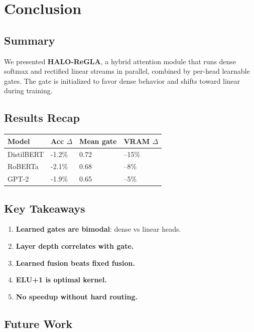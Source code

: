 
\section{Conclusion}

\subsection{Summary}

We presented \textbf{HALO-ReGLA}, a hybrid attention module that runs dense 
softmax and rectified linear streams in parallel, combined by per-head 
learnable gates. The gate is initialized to favor dense behavior and shifts 
toward linear during training.

\subsection{Results Recap}

\begin{table}[H]
\centering
\small
\begin{tabular}{llll}
\toprule
\textbf{Model} & \textbf{Acc $\Delta$} & \textbf{Mean gate} & \textbf{VRAM $\Delta$} \\
\midrule
DistilBERT & -1.2\% & 0.72 & --15\% \\
RoBERTa & -2.1\% & 0.68 & --8\% \\
GPT-2 & -1.9\% & 0.65 & --5\% \\
\bottomrule
\end{tabular}
\end{table}

\subsection{Key Takeaways}

\begin{enumerate}
\item \textbf{Learned gates are bimodal}: dense vs linear heads.
\item \textbf{Layer depth correlates with gate.}
\item \textbf{Learned fusion beats fixed fusion.}
\item \textbf{ELU+1 is optimal kernel.}
\item \textbf{No speedup without hard routing.}

\end{enumerate}
\subsection{Future Work}

